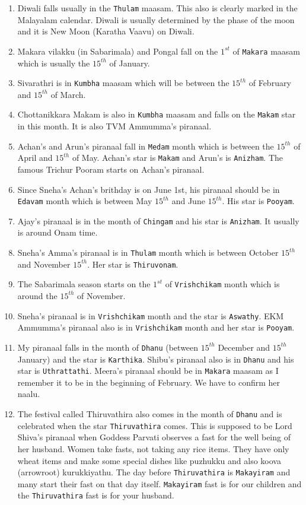 \documentclass[10pt,twoside]{article}
\begin{document}
\begin{enumerate}
\item Diwali falls usually in the \verb|Thulam| maasam. This also is clearly marked in the Malayalam calendar. Diwali is usually determined by the phase of the moon and it is New Moon (Karatha Vaavu) on Diwali.
\item Makara vilakku (in Sabarimala) and Pongal fall on the $1^{st}$ of \verb|Makara| maasam which is usually the $15^{th}$ of January.
\item Sivarathri is in \verb|Kumbha| maasam which will be between the $15^{th}$ of February and $15^{th}$ of March.
\item Chottanikkara Makam is also in \verb|Kumbha| maasam and falls on the \verb|Makam| star in this month. It is also TVM Ammumma's piranaal.
\item Achan's and Arun's piranaal fall in \verb|Medam| month which is between the $15^{th}$ of April and $15^{th}$ of May. Achan's star is \verb|Makam| and Arun's is \verb|Anizham|. The famous Trichur Pooram starts on Achan's piranaal.
\item Since Sneha's Achan's brithday is on June 1st, his piranaal should be in \verb|Edavam| month which is between May $15^{th}$ and June $15^{th}$. His star is \verb|Pooyam|.
\item Ajay's piranaal is in the month of \verb|Chingam| and his star is \verb|Anizham|. It usually is around Onam time. 
\item Sneha's Amma's piranaal is in \verb|Thulam| month which is between October $15^{th}$ and November $15^{th}$. Her star is \verb|Thiruvonam|.
\item The Sabarimala season starts on the $1^{st}$ of \verb|Vrishchikam| month which is around the $15^{th}$ of November.
\item Sneha's piranaal is in \verb|Vrishchikam| month and the star is \verb|Aswathy|. EKM Ammumma's piranaal also is in \verb|Vrishchikam| month and her star is \verb|Pooyam|.
\item My piranaal falls in the month of \verb|Dhanu| (between $15^{th}$ December and $15^{th}$ January) and the star is \verb|Karthika|. Shibu's piranaal also is in \verb|Dhanu| and his star is \verb|Uthrattathi|. Meera's piranaal should be in \verb|Makara| maasam as I remember it to be in the beginning of February. We have to confirm her naalu.
\item The festival called Thiruvathira also comes in the month of \verb|Dhanu| and is celebrated when the star \verb|Thiruvathira| comes. This is supposed to be Lord Shiva's piranaal when Goddess Parvati observes a fast for the well being of her husband. Women take fasts, not taking any rice items. They have only wheat items and make some special dishes like puzhukku and also koova (arrowroot) kurukkiyathu. The day before \verb|Thiruvathira| is \verb|Makayiram| and many start their fast on that day itself. \verb|Makayiram| fast is for our children and the \verb|Thiruvathira| fast is for your husband.
\end{enumerate}
\end{document}
